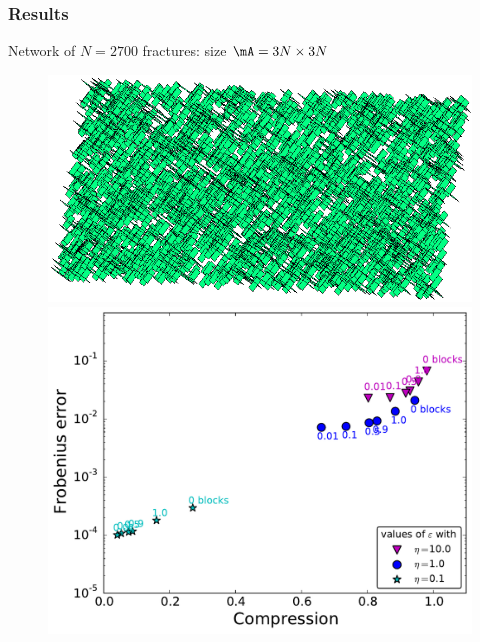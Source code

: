 
\begin{frame}
\frametitle{Results}

\small

Network of $N=2700$ fractures: size $\mA=3N\times 3N$
\vspace{-5pt}
\begin{figure}
\centering
\begin{minipage}[c]{.39\linewidth}
\includegraphics[width=\textwidth]{../images/visu_maillage2700FracsV2D2.png}
\end{minipage}
\begin{minipage}[c]{.6\linewidth}
\includegraphics[width=\textwidth]{../images/graphe_compare_output_compression_18_08_2016matrice2700FracsV2D2.pdf}
\end{minipage}
\end{figure}

\end{frame}

